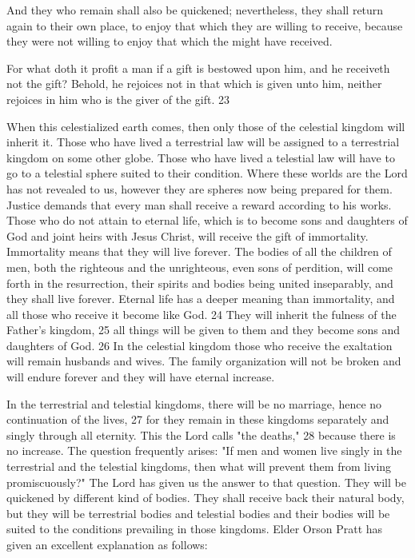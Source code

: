 And they who remain shall also be quickened; nevertheless, they shall return again to their
own place, to enjoy that which they are willing to receive, because they were not willing to
enjoy that which the might have received.

For what doth it profit a man if a gift is bestowed upon him, and he receiveth not the gift?
Behold, he rejoices not in that which is given unto him, neither rejoices in him who is the
giver of the gift. 23

When this celestialized earth comes, then only those of the celestial kingdom will inherit it.
Those who have lived a terrestrial law will be assigned to a terrestrial kingdom on some other
globe. Those who have lived a telestial law will have to go to a telestial sphere suited to their
condition. Where these worlds are the Lord has not revealed to us, however they are spheres
now being prepared for them. Justice demands that every man shall receive a reward
according to his works. Those who do not attain to eternal life, which is to become sons and
daughters of God and joint heirs with Jesus Christ, will receive the gift of immortality.
Immortality means that they will live forever. The bodies of all the children of men, both the
righteous and the unrighteous, even sons of perdition, will come forth in the resurrection,
their spirits and bodies being united inseparably, and they shall live forever. Eternal life has a
deeper meaning than immortality, and all those who receive it become like God. 24 They will
inherit the fulness of the Father's kingdom, 25 all things will be given to them and they
become sons and daughters of God. 26 In the celestial kingdom those who receive the
exaltation will remain husbands and wives. The family organization will not be broken and
will endure forever and they will have eternal increase.

In the terrestrial and telestial kingdoms, there will be no marriage, hence no continuation of
the lives, 27 for they remain in these kingdoms separately and singly through all eternity.
This the Lord calls "the deaths," 28 because there is no increase. The question frequently
arises: "If men and women live singly in the terrestrial and the telestial kingdoms, then what
will prevent them from living promiscuously?" The Lord has given us the answer to that
question. They will be quickened by different kind of bodies. They shall receive back their
natural body, but they will be terrestrial bodies and telestial bodies and their bodies will be
suited to the conditions prevailing in those kingdoms. Elder Orson Pratt has given an
excellent explanation as follows:

